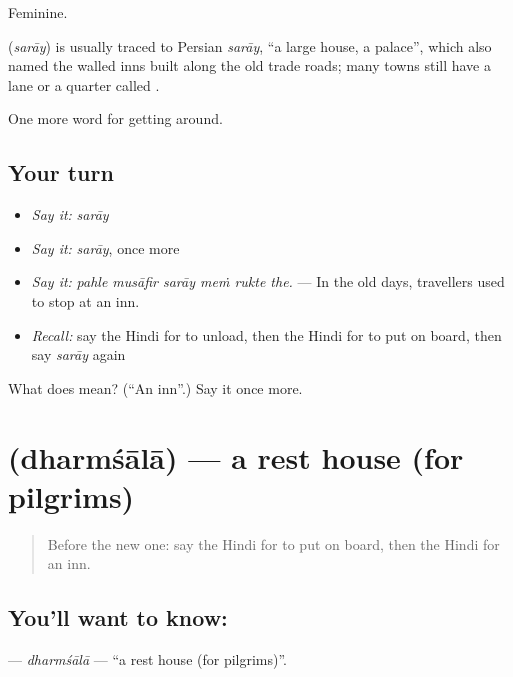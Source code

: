 Feminine.

\begin{cousinweb}
\textbf{} (\emph{sarāy}) is usually traced to Persian \emph{sarāy}, \textquotedblleft{}a large house, a palace\textquotedblright{}, which also named the walled inns built along the old trade roads; many towns still have a lane or a quarter called .
\end{cousinweb}

\begin{grammarlens}[title={What you've built}]
One more word for getting around.
\end{grammarlens}

\subsection*{Your turn}
\begin{itemize}
\raggedright
  \item \emph{Say it:} \emph{sarāy}
  \item \emph{Say it:} \emph{sarāy}, once more
  \item \emph{Say it:} \emph{pahle musāfir sarāy meṁ rukte the.} — In the old days, travellers used to stop at an inn.
  \item \emph{Recall:} say the Hindi for to unload, then the Hindi for to put on board, then say \emph{sarāy} again
\end{itemize}

\begin{tcolorbox}[breakable,colback=teal!4,colframe=teal!35!black,title={Before you move on}]
What does  mean? (\textquotedblleft{}An inn\textquotedblright{}.) Say it once more.
\end{tcolorbox}
\section[\texorpdfstring{\hi{धर्मशाला} (dharmśālā)}{धर्मशाला (dharmśālā)}]{ (dharmśālā) — a rest house (for pilgrims)}

\label{lesson:HI-C413-dharmsala}



\begin{quote}
Before the new one: say the Hindi for to put on board, then the Hindi for an inn.
\end{quote}

\subsection*{You'll want to know: }
\textbf{} — \emph{dharmśālā} — \textquotedblleft{}a rest house (for pilgrims)\textquotedblright{}.

